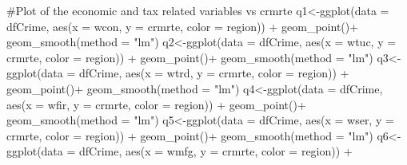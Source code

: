\documentclass[]{article}
\newenvironment{Shaded}{}{}
\newcommand{\CommentTok}[1]{\textcolor[rgb]{0.00,0.50,0.00}{#1}}
\newcommand{\DataTypeTok}[1]{#1}
\newcommand{\KeywordTok}[1]{\textcolor[rgb]{0.00,0.00,1.00}{#1}}
\newcommand{\NormalTok}[1]{#1}
\newcommand{\OperatorTok}[1]{#1}
\newcommand{\StringTok}[1]{\textcolor[rgb]{0.00,0.50,0.50}{#1}}
\begin{document}
\begin{Shaded}
\begin{Highlighting}[]
\CommentTok{#Plot of the economic and tax related variables vs crmrte}
\NormalTok{q1<-}\KeywordTok{ggplot}\NormalTok{(}\DataTypeTok{data =}\NormalTok{ dfCrime, }\KeywordTok{aes}\NormalTok{(}\DataTypeTok{x =}\NormalTok{ wcon, }\DataTypeTok{y =}\NormalTok{ crmrte, }\DataTypeTok{color =}\NormalTok{ region)) }\OperatorTok{+}\StringTok{ }
\StringTok{      }\KeywordTok{geom_point}\NormalTok{()}\OperatorTok{+}
\StringTok{  }\KeywordTok{geom_smooth}\NormalTok{(}\DataTypeTok{method =} \StringTok{"lm"}\NormalTok{)}
\NormalTok{q2<-}\KeywordTok{ggplot}\NormalTok{(}\DataTypeTok{data =}\NormalTok{ dfCrime, }\KeywordTok{aes}\NormalTok{(}\DataTypeTok{x =}\NormalTok{ wtuc, }\DataTypeTok{y =}\NormalTok{ crmrte, }\DataTypeTok{color =}\NormalTok{ region)) }\OperatorTok{+}\StringTok{ }
\StringTok{      }\KeywordTok{geom_point}\NormalTok{()}\OperatorTok{+}
\StringTok{  }\KeywordTok{geom_smooth}\NormalTok{(}\DataTypeTok{method =} \StringTok{"lm"}\NormalTok{)}
\NormalTok{q3<-}\KeywordTok{ggplot}\NormalTok{(}\DataTypeTok{data =}\NormalTok{ dfCrime, }\KeywordTok{aes}\NormalTok{(}\DataTypeTok{x =}\NormalTok{ wtrd, }\DataTypeTok{y =}\NormalTok{ crmrte, }\DataTypeTok{color =}\NormalTok{ region)) }\OperatorTok{+}\StringTok{ }
\StringTok{      }\KeywordTok{geom_point}\NormalTok{()}\OperatorTok{+}
\StringTok{  }\KeywordTok{geom_smooth}\NormalTok{(}\DataTypeTok{method =} \StringTok{"lm"}\NormalTok{)}
\NormalTok{q4<-}\KeywordTok{ggplot}\NormalTok{(}\DataTypeTok{data =}\NormalTok{ dfCrime, }\KeywordTok{aes}\NormalTok{(}\DataTypeTok{x =}\NormalTok{ wfir, }\DataTypeTok{y =}\NormalTok{ crmrte, }\DataTypeTok{color =}\NormalTok{ region)) }\OperatorTok{+}\StringTok{ }
\StringTok{      }\KeywordTok{geom_point}\NormalTok{()}\OperatorTok{+}
\StringTok{  }\KeywordTok{geom_smooth}\NormalTok{(}\DataTypeTok{method =} \StringTok{"lm"}\NormalTok{)}
\NormalTok{q5<-}\KeywordTok{ggplot}\NormalTok{(}\DataTypeTok{data =}\NormalTok{ dfCrime, }\KeywordTok{aes}\NormalTok{(}\DataTypeTok{x =}\NormalTok{ wser, }\DataTypeTok{y =}\NormalTok{ crmrte, }\DataTypeTok{color =}\NormalTok{ region)) }\OperatorTok{+}\StringTok{ }
\StringTok{      }\KeywordTok{geom_point}\NormalTok{()}\OperatorTok{+}
\StringTok{  }\KeywordTok{geom_smooth}\NormalTok{(}\DataTypeTok{method =} \StringTok{"lm"}\NormalTok{)}
\NormalTok{q6<-}\KeywordTok{ggplot}\NormalTok{(}\DataTypeTok{data =}\NormalTok{ dfCrime, }\KeywordTok{aes}\NormalTok{(}\DataTypeTok{x =}\NormalTok{ wmfg, }\DataTypeTok{y =}\NormalTok{ crmrte, }\DataTypeTok{color =}\NormalTok{ region)) }\OperatorTok{+}\StringTok{ }

\end{Highlighting}
\end{Shaded}
\end{document}
